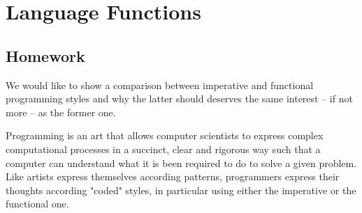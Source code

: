 
\chapter{Language Functions}

\section{Homework}

\iffalse


Imperative vs Functional style

state-oriented computation / lambda-calculus oriented
looping primitives / recursion
memory pointers / referential transparency
easy to grasp / hard to learn
difficult to reason about / allows theoretical studies

\fi

We would like to show a comparison between imperative and functional programming styles and why
the latter should deserves the same interest -- if not more -- as the
former one.

Programming is an art that allows computer scientists to express
complex computational processes in a succinct, clear and rigorous way
such that a computer can understand what it is been required to do to
solve a given problem. Like artists express themselves according
patterns, programmers express their thoughts according "coded" styles,
in particular using either the imperative or the functional one.

